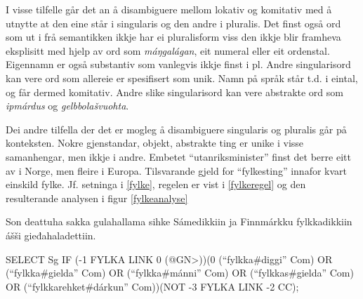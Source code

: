 \documentclass[a4paper,norsk]{article}
\begin{document}
I visse tilfelle  går det an å disambiguere mellom lokativ og komitativ med å utnytte at den eine står i singularis og den andre i pluralis. %
Det finst også ord som ut i frå semantikken ikkje har ei pluralisform viss den ikkje blir framheva eksplisitt med hjelp av ord som \textit{máŋgalágan}, eit numeral eller eit ordenstal. Eigennamn er også substantiv som vanlegvis ikkje finst i pl. Andre singularisord kan vere ord som allereie er spesifisert som unik. Namn på språk står t.d. i eintal, og får dermed komitativ. Andre slike singularisord kan vere abstrakte ord som \textit{ipmárdus} og \textit{gelbbolašvuohta}. %

Dei andre tilfella der det er mogleg å disambiguere singularis og pluralis går på konteksten. Nokre gjenstandar, objekt, abstrakte ting er unike i visse samanhengar, men ikkje i andre. Embetet ``utanriksminister'' finst det berre eitt av i Norge, men fleire i Europa. Tilsvarande gjeld for ``fylkesting'' innafor kvart einskild fylke. Jf. setninga i \ref{fylke}, regelen er vist i \ref{fylkeregel} og den resulterande analysen i figur \ref{fylkeanalyse} %

\begin{example}\label{fylke}
Son deattuha sakka gulahallama sihke Sámedikkiin ja Finnmárkku fylkkadikkiin ášši gieđahaladettiin.
\end{example}

\begin{example}\label{fylkeregel}
SELECT Sg IF (-1 FYLKA LINK 0 (@GN>))(0 (``fylkka\#diggi'' Com) OR (``fylkka\#gielda'' Com) OR (``fylkka\#mánni'' Com) OR (``fylkkas\#gielda'' Com) OR (``fylkkarehket\#dárkun'' Com))(NOT -3 FYLKA LINK -2 CC);
\end{example}
\end{document}
